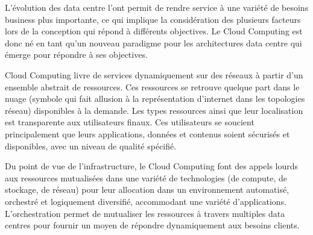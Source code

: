

L'évolution des data centre l'ont permit de rendre service à une variété de besoins business plus importante, ce qui implique la considération des plusieurs facteurs lors de la conception qui répond à différents objectives. Le Cloud Computing est donc né en tant qu'un nouveau paradigme pour les architectures data centre qui émerge pour répondre à ses objectives.


Cloud Computing livre de services dynamiquement sur des réseaux à partir d'un ensemble abstrait de ressources. Ces ressources se retrouve quelque part dans le \og nuage \fg{} (symbole qui fait allusion à la représentation d'internet dans les topologies réseau) disponibles à la demande. Les types ressources ainsi que leur localisation est transparente aux utilisateurs finaux. Ces utilisateurs se soucient principalement que leurs applications, données et contenus soient sécurisés et disponibles, avec un niveau de qualité spécifié.


Du point de vue de l'infrastructure, le Cloud Computing font des appels lourds aux ressources mutualisées dans une variété de technologies (de compute, de stockage, de réseau) pour leur allocation dans un environnement automatisé, orchestré et logiquement diversifié, accommodant une variété d'applications. L'orchestration permet de mutualiser les ressources à travers multiples data centres pour fournir un moyen de répondre dynamiquement aux besoins clients.

